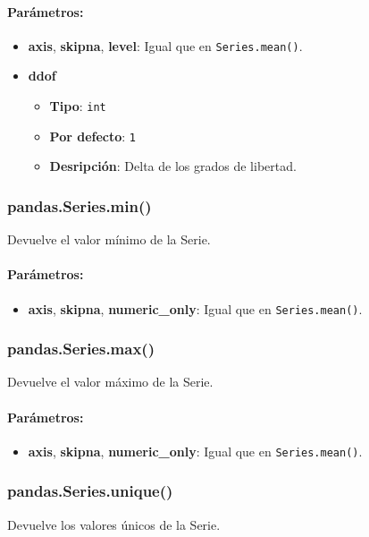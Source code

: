     \paragraph{Parámetros:}
    \begin{itemize}
        \item \textbf{axis}, \textbf{skipna}, \textbf{level}: Igual que en \texttt{Series.mean()}.
        \item \textbf{ddof}
            \begin{itemize}
                \item \textbf{Tipo}: \texttt{int}
                \item \textbf{Por defecto}: \texttt{1}
                \item \textbf{Desripción}: Delta de los grados de libertad.
            \end{itemize}
    \end{itemize}

    \subsubsection{pandas.Series.min()} Devuelve el valor mínimo de la Serie.

    \paragraph{Parámetros:}
    \begin{itemize}
        \item \textbf{axis}, \textbf{skipna}, \textbf{numeric\_only}: Igual que en \texttt{Series.mean()}.
    \end{itemize}

    \subsubsection{pandas.Series.max()} Devuelve el valor máximo de la Serie.

    \paragraph{Parámetros:}
    \begin{itemize}
        \item \textbf{axis}, \textbf{skipna}, \textbf{numeric\_only}: Igual que en \texttt{Series.mean()}.
    \end{itemize}

    \subsubsection{pandas.Series.unique()} Devuelve los valores únicos de la Serie.

